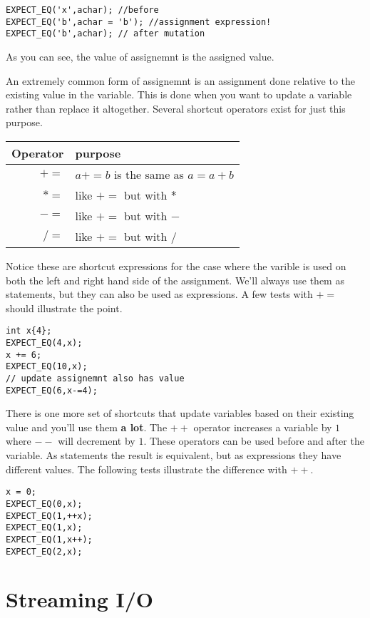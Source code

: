 \documentclass[]{tufte-handout}
\begin{document}
\begin{verbatim}
EXPECT_EQ('x',achar); //before
EXPECT_EQ('b',achar = 'b'); //assignment expression!
EXPECT_EQ('b',achar); // after mutation
\end{verbatim}

As you can see, the value of assignemnt is the assigned value.

An extremely common form of assignemnt is an assignment done relative to the existing value in the variable. This is done when you want to update a variable rather than replace it altogether. Several shortcut operators exist for just this purpose.
\begin{center}
\begin{tabular}{rl}
Operator & purpose \\ \hline
$+=$ & $a+=b$ is the same as $a = a + b$ \\
$*=$ & like $+=$ but with $*$ \\
$-=$ & like $+=$ but with $-$ \\
$/=$ & like $+=$ but with $/$
\end{tabular}
\end{center}

Notice these are shortcut expressions for the case where the varible is used on
both the left and right hand side of the assignment. We'll always use them as statements, but they can also be used as expressions. A few tests with $+=$ should illustrate the point.

\begin{verbatim}
int x{4};
EXPECT_EQ(4,x);
x += 6;
EXPECT_EQ(10,x);
// update assignemnt also has value
EXPECT_EQ(6,x-=4);
\end{verbatim}

There is one more set of shortcuts that update variables based on their existing value and you'll use them \textbf{a lot}. The $++$ operator increases a variable by $1$ where $--$ will decrement by $1$. These operators can be used before and after the variable. As statements the result is equivalent, but as expressions they have different values. The following tests illustrate the difference with $++$.

\begin{verbatim}
x = 0;
EXPECT_EQ(0,x);
EXPECT_EQ(1,++x);
EXPECT_EQ(1,x);
EXPECT_EQ(1,x++);
EXPECT_EQ(2,x);
\end{verbatim}

\section{Streaming I/O}
\end{document}
